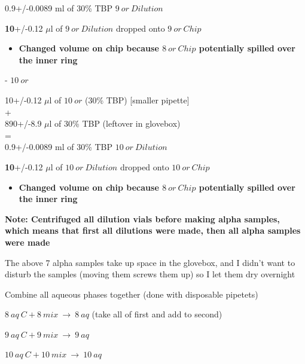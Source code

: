 \documentclass[idxtotoc,hyperref,openany,oneside]{labbook} %
\newcommand{\cmark}{\ding{51}}%
\newcommand{\done}{\rlap{$\square$}{\raisebox{2pt}{\large\hspace{1pt}\cmark}}%
  \hspace{-2.5pt}}
\begin{document}
\begin{todolist}
\begin{center}
0.9+/-0.0089 ml of 30\% TBP $\boxed{9\ or\ Dilution}$
\end{center}
\vspace{0.3cm}
\begin{center}
  \textbf{10}+/-0.12 $\mu$l of $\boxed{9\ or\ Dilution}$ dropped onto
  $\boxed{9\ or\ Chip}$
\end{center}
\begin{itemize}
\item{\textbf{Changed volume on chip because $\boxed{8\ or\ Chip}$
    potentially spilled over the inner ring}}
\end{itemize}
\begin{todolist}
\item[\done]{- $\boxed{10\ or}$}
\end{todolist}
\begin{center}
10+/-0.12 $\mu$l of $\boxed{10\ or}$ (30\% TBP) [smaller pipette]\\
+\\
890+/-8.9 $\mu$l of 30\% TBP (leftover in glovebox)\\
=\\
0.9+/-0.0089 ml of 30\% TBP $\boxed{10\ or\ Dilution}$
\end{center}
\vspace{0.3cm}
\begin{center}
  \textbf{10}+/-0.12 $\mu$l of $\boxed{10\ or\ Dilution}$ dropped onto
  $\boxed{10\ or\ Chip}$
\end{center}
\begin{itemize}
\item{\textbf{Changed volume on chip because $\boxed{8\ or\ Chip}$
    potentially spilled over the inner ring}}
\end{itemize}
\item[\done]{\textbf{Note: Centrifuged all dilution vials before making
    alpha samples, which means that first all dilutions were made,
    then all alpha samples were made}}
\item[\done]{The above 7 alpha samples take up space in the
  glovebox, and I didn't want to disturb the samples (moving them
  screws them up) so I let them dry overnight}
\end{todolist}


\begin{todolist}
\item[\done]{Combine all aqueous phases together (done with disposable
pipetets)}
  \begin{todolist}
  \item[\done]{$\boxed{8\ aq\ C}+\boxed{8\ mix}\ \rightarrow\ \boxed{8\ aq}$
    (take all of first and add to second)}
  \item[\done]{$\boxed{9\ aq\ C}+\boxed{9\ mix}\ \rightarrow\ \boxed{9\ aq}$}
  \item[\done]{$\boxed{10\ aq\ C}+\boxed{10\ mix}\ \rightarrow\ \boxed{10\ aq}$}
  \end{todolist}
\end{todolist}
\end{document}
